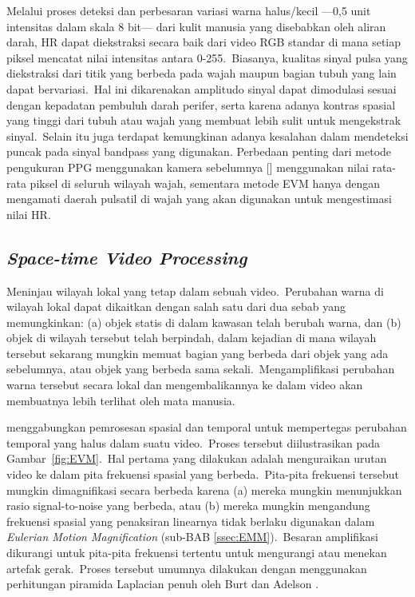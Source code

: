 Melalui proses deteksi dan perbesaran variasi warna halus/kecil ---0,5 unit intensitas dalam skala 8 bit--- dari kulit manusia yang disebabkan oleh aliran darah, HR dapat diekstraksi secara baik dari video RGB standar di mana setiap piksel mencatat nilai intensitas antara 0-255.~Biasanya, kualitas sinyal pulsa yang diekstraksi dari titik yang berbeda pada wajah maupun bagian tubuh yang lain dapat bervariasi.~Hal ini dikarenakan amplitudo sinyal dapat dimodulasi sesuai dengan kepadatan pembuluh darah perifer, serta karena adanya kontras spasial yang tinggi dari tubuh atau wajah yang membuat lebih sulit untuk mengekstrak sinyal.~Selain itu juga terdapat kemungkinan adanya kesalahan dalam mendeteksi puncak pada sinyal bandpass yang digunakan.
Perbedaan penting dari metode pengukuran PPG menggunakan kamera sebelumnya [\citet{kong2013,lazaro2014,lewandowska2011,Mirmo2016,Poh2010,Poh2011,Sun2012,Verkruysse2008}] menggunakan nilai rata-rata piksel di seluruh wilayah wajah, sementara metode EVM hanya dengan mengamati daerah pulsatil di wajah yang akan digunakan untuk mengestimasi nilai HR. 

\subsection{\textit{Space-time Video Processing}}
Meninjau wilayah lokal yang tetap dalam sebuah video.~Perubahan warna di wilayah lokal dapat dikaitkan dengan salah satu dari dua sebab yang memungkinkan: (a) objek statis di dalam kawasan telah berubah warna, dan (b) objek di wilayah tersebut telah berpindah, dalam kejadian di mana wilayah tersebut sekarang mungkin memuat bagian yang berbeda dari objek yang ada sebelumnya, atau objek yang berbeda sama sekali.~Mengamplifikasi perubahan warna tersebut secara lokal dan mengembalikannya ke dalam video akan membuatnya lebih terlihat oleh mata manusia.

\citet{RubinsteinPhDThesis2014} menggabungkan pemrosesan spasial dan temporal untuk mempertegas perubahan temporal yang halus dalam suatu video.~Proses tersebut diilustrasikan pada Gambar~\ref{fig:EVM}.~Hal pertama yang dilakukan adalah menguraikan urutan video ke dalam pita frekuensi spasial yang berbeda.~Pita-pita frekuensi tersebut mungkin dimagnifikasi secara berbeda karena (a) mereka mungkin menunjukkan rasio signal-to-noise yang berbeda, atau (b) mereka mungkin mengandung frekuensi spasial yang penaksiran linearnya tidak berlaku digunakan dalam \textit{Eulerian Motion Magnification} (sub-BAB \ref{ssec:EMM}).~Besaran amplifikasi dikurangi untuk pita-pita frekuensi tertentu untuk mengurangi atau menekan artefak gerak.~Proses tersebut umumnya dilakukan dengan menggunakan perhitungan piramida Laplacian penuh oleh Burt dan Adelson \citep{burt1983}.

